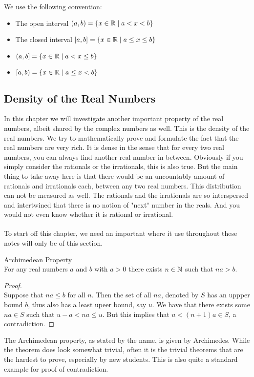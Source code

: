 \documentclass[a4paper]{article}
\begin{document}
We use the following convention: 
\begin{itemize}
\item The open interval $(a,b)=\{x\in\mathbb{R}\;|\;a<x<b\}$
\item The closed interval $[a,b]=\{x\in\mathbb{R}\;|\;a\leq x\leq b\}$
\item $(a,b]=\{x\in\mathbb{R}\;|\;a<x\leq b\}$
\item $[a,b)=\{x\in\mathbb{R}\;|\;a\leq x<b\}$
\end{itemize}

\subsection{Density of the Real Numbers}
In this chapter we will investigate another important property of the real numbers, albeit shared by the complex numbers as well. This is the density of the real numbers. We try to mathematically prove and formulate the fact that the real numbers are very rich. It is dense in the sense that for every two real numbers, you can always find another real number in between. Obviously if you simply consider the rationals or the irrationals, this is also true. But the main thing to take away here is that there would be an uncountably amount of rationals and irrationals each, between any two real numbers. This distribution can not be measured as well. The rationals and the irrationals are so interspersed and intertwined that there is no notion of "next" number in the reals. And you would not even know whether it is rational or irrational. \\~\\

To start off this chapter, we need an important where it use throughout these notes will only be of this section. 

\begin{thm}{Archimedean Property}{}\\ For any real numbers $a$ and $b$ with $a>0$ there exists $n\in\mathbb{N}$ such that $na>b$. 
\begin{proof}\\ Suppose that $na\leq b$ for all $n$. Then the set of all $na$, denoted by $S$ has an uppper bound $b$, thus also has a least upeer bound, say $u$. We have that there exists some $na\in S$ such that $u-a<na\leq u$. But this implies that $u<(n+1)a\in S$, a contradiction. 
\end{proof}
\end{thm}

The Archimedean property, as stated by the name, is given by Archimedes. While the theorem does look somewhat trivial, often it is the trivial theorems that are the hardest to prove, especially by new students. This is also quite a standard example for proof of contradiction. \\~\\
\end{document}
